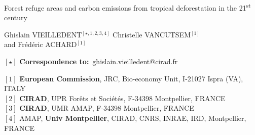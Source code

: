 \renewcommand{\bibsection}{}  %

\begin{center}
  \LARGE{Forest refuge areas and carbon emissions from tropical deforestation in the 21\textsuperscript{st} century}
\end{center}

\vspace{1cm}

\begin{center}
  \large{
  Ghislain VIEILLEDENT$^{[\star, 1, 2, 3, 4]}$ \hspace{0.5cm} Christelle VANCUTSEM$^{[1]}$\\
  \vspace{0.5cm}
  and \hspace{0.5cm} Frédéric ACHARD$^{[1]}$
  }
\end{center}

\vspace{0.5cm}

\begin{center}
  $[\star]$ \textbf{Correspondence to:}~ghislain.vieilledent@cirad.fr\\
\end{center}

\vspace{0.5cm}

{\small
  \begin{flushleft}
    $[1]$ \textbf{European Commission}, JRC, Bio-economy Unit, I-21027 Ispra (VA), ITALY\\
    $[2]$ \textbf{CIRAD}, UPR Forêts et Sociétés, F-34398 Montpellier, FRANCE\\
    $[3]$ \textbf{CIRAD}, UMR AMAP, F-34398 Montpellier, FRANCE\\
    $[4]$ AMAP, \textbf{Univ Montpellier}, CIRAD, CNRS, INRAE, IRD, Montpellier, FRANCE\\
  \end{flushleft}}

